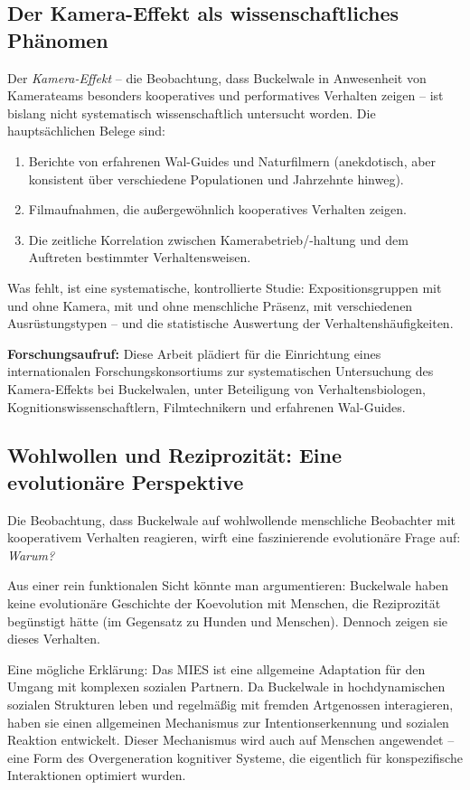 ﻿\documentclass[12pt,a4paper]{article}
\theoremstyle{definition}
\theoremstyle{remark}
\begin{document}
\subsection{Der Kamera-Effekt als wissenschaftliches Phänomen}

Der \emph{Kamera-Effekt} -- die Beobachtung, dass Buckelwale in Anwesenheit
von Kamerateams besonders kooperatives und performatives Verhalten zeigen
-- ist bislang nicht systematisch wissenschaftlich untersucht worden. Die
hauptsächlichen Belege sind:

\begin{enumerate}
  \item Berichte von erfahrenen Wal-Guides und Naturfilmern (anekdotisch,
        aber konsistent über verschiedene Populationen und Jahrzehnte hinweg).
  \item Filmaufnahmen, die außergewöhnlich kooperatives Verhalten zeigen.
  \item Die zeitliche Korrelation zwischen Kamerabetrieb/-haltung und dem
        Auftreten bestimmter Verhaltensweisen.
\end{enumerate}

Was fehlt, ist eine systematische, kontrollierte Studie: Expositionsgruppen
mit und ohne Kamera, mit und ohne menschliche Präsenz, mit verschiedenen
Ausrüstungstypen -- und die statistische Auswertung der Verhaltenshäufigkeiten.

\textbf{Forschungsaufruf:} Diese Arbeit plädiert für die Einrichtung eines
internationalen Forschungskonsortiums zur systematischen Untersuchung des
Kamera-Effekts bei Buckelwalen, unter Beteiligung von Verhaltensbiologen,
Kognitionswissenschaftlern, Filmtechnikern und erfahrenen Wal-Guides.

\subsection{Wohlwollen und Reziprozität: Eine evolutionäre Perspektive}

Die Beobachtung, dass Buckelwale auf wohlwollende menschliche Beobachter
mit kooperativem Verhalten reagieren, wirft eine faszinierende evolutionäre
Frage auf: \emph{Warum?}

Aus einer rein funktionalen Sicht könnte man argumentieren: Buckelwale haben
keine evolutionäre Geschichte der Koevolution mit Menschen, die Reziprozität
begünstigt hätte (im Gegensatz zu Hunden und Menschen). Dennoch zeigen sie
dieses Verhalten.

Eine mögliche Erklärung: Das MIES ist eine allgemeine Adaptation für den
Umgang mit komplexen sozialen Partnern. Da Buckelwale in hochdynamischen sozialen
Strukturen leben und regelmäßig mit fremden Artgenossen interagieren, haben
sie einen allgemeinen Mechanismus zur Intentionserkennung und sozialen Reaktion
entwickelt. Dieser Mechanismus wird auch auf Menschen angewendet -- eine Form
des Overgeneration kognitiver Systeme, die eigentlich für konspezifische
Interaktionen optimiert wurden.
\end{document}

